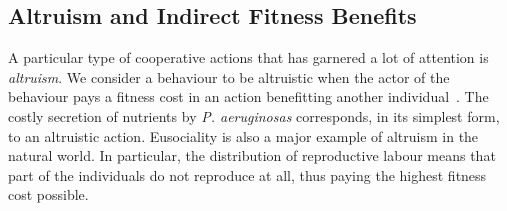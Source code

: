 
  \subsection{Altruism and Indirect Fitness Benefits}

    A particular type of cooperative actions that has garnered a lot of attention is \emph{altruism}. We consider a behaviour to be altruistic when the actor of the behaviour pays a fitness cost in an action benefitting another individual~\parencite{Hamilton1964, West2007a}. The costly secretion of nutrients by \emph{P. aeruginosas} corresponds, in its simplest form, to an altruistic action. Eusociality is also a major example of altruism in the natural world. In particular, the distribution of reproductive labour means that part of the individuals do not reproduce at all, thus paying the highest fitness cost possible. 

